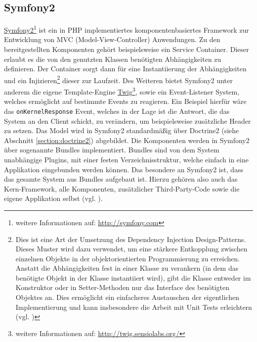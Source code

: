 \subsection{Symfony2}\label{section:symfony2}
\href{http://symfony.com}{Symfony2}\footnote{weitere Informationen auf: \url{http://symfony.com}} ist ein in PHP implementiertes komponentenbasiertes Framework zur Entwicklung von MVC (Model-View-Controller) Anwendungen. Zu den bereitgestellten Komponenten gehört beispielsweise ein Service Container. Dieser erlaubt es die von den genutzten Klassen benötigten Abhängigkeiten zu definieren. Der Container sorgt dann für eine Instantiierung der Abhängigkeiten und ein Injizieren\footnote{Dies ist eine Art der Umsetzung des Dependency Injection Design-Patterns. Dieses Muster wird dazu verwendet, um eine stärkere Entkopplung zwischen einzelnen Objekte in der objektorientierten Programmierung zu erreichen. Anstatt die Abhängigkeiten fest in einer Klasse zu verankern (in dem das benötigte Objekt in der Klasse instantiiert wird), gibt die Klasse entweder im Konstruktor oder in Setter-Methoden nur das Interface des benötigten Objektes an. Dies ermöglicht ein einfacheres Austauschen der eigentlichen Implementierung und kann insbesondere die Arbeit mit Unit Tests erleichtern (vgl. \cite{Fowler2004})} dieser zur Laufzeit. Des Weiteren bietet Symfony2 unter anderem die eigene Template-Engine \href{http://twig.sensiolabs.org/}{Twig}\footnote{weitere Informationen auf: \url{http://twig.sensiolabs.org/}}, sowie ein Event-Listener System, welches ermöglicht auf bestimmte Events zu reagieren. Ein Beispiel hierfür wäre das \texttt{onKernelResponse} Event, welches in der Lage ist die Antwort, die das System an den Client schickt, zu verändern, um beispielsweise zusätzliche Header zu setzen. Das Model wird in Symfony2 standardmäßig über Doctrine2 (siehe Abschnitt \ref{section:doctrine2}) abgebildet.
Die Komponenten werden in Symfony2 über sogenannte Bundles implementiert. Bundles sind von dem System unabhängige Plugins, mit einer festen Verzeichnisstruktur, welche einfach in eine Applikation eingebunden werden können. Das besondere an Symfony2 ist, dass das gesamte System aus Bundles aufgebaut ist. Hierzu gehören also auch das Kern-Framework, alle Komponenten, zusätzlicher Third-Party-Code sowie die eigene Applikation selbst (vgl. \cite{Symfony2Bundles}).

